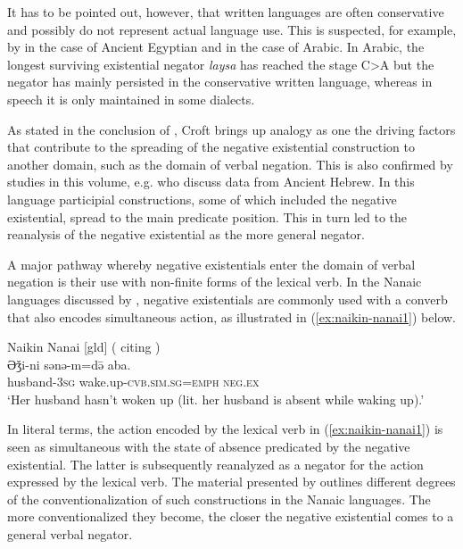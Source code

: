 \documentclass[output=paper,chinesefont,colorlinks,citecolor=brown]{langscibook}
\begin{document}
It has to be pointed out, however, that written languages are often conservative and possibly do not represent actual language use. This is suspected, for example, by  in the case of Ancient Egyptian and  in the case of Arabic. In Arabic, the longest surviving existential negator \textit{laysa} has reached the stage C>A but the negator has mainly persisted in the conservative written language, whereas in speech it is only maintained in some dialects.

As stated in the conclusion of  , Croft brings up analogy as one the driving factors that contribute to the spreading of the negative existential construction to another domain, such as the domain of verbal negation. This is also confirmed by studies in this volume, e.g.  who discuss data from Ancient Hebrew. In this language  participial constructions, some of which included the negative existential, spread to the main predicate position. This in turn led to the reanalysis of the negative existential as the more general negator.

A major pathway whereby negative existentials enter the domain of verbal negation is their use with non-finite forms of the lexical verb. In the Nanaic languages discussed by ,
negative existentials are commonly used with a converb that also encodes simultaneous action, as illustrated in (\ref{ex:naikin-nanai1}) below.

\begin{exe}
\ex Naikin Nanai [gld] ( citing \citet[209, text]{avrorin1986a}\label{ex:naikin-nanai1})\\
\gll Əǯi-ni sənə-m=də̄ aba.\\
husband-\textsc{3sg} wake.up-\textsc{cvb.sim.sg=emph} \textsc{neg.ex}\\
\glt `Her husband hasn’t woken up (lit. her husband is absent while waking up).' 
\end{exe}
In literal terms, the action encoded by the lexical verb in (\ref{ex:naikin-nanai1}) is seen as simultaneous with the state of absence predicated by the negative existential. The latter is subsequently reanalyzed as a negator for the action expressed by the lexical verb. The material presented by  outlines different degrees of the conventionalization of such constructions in the Nanaic languages. The more conventionalized they become, the closer the negative existential comes to a general verbal negator.
\end{document}
